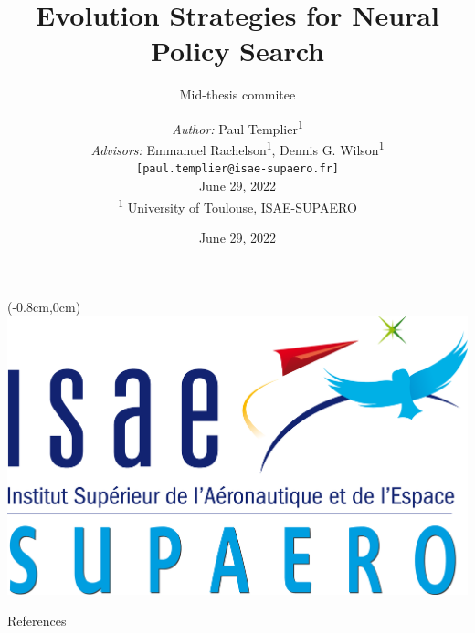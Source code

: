 \documentclass[usenames,dvipsnames,aspectratio=169]{beamer}
\title[Mid-thesis defense]{Evolution Strategies for Neural Policy Search}
\subtitle[]{Mid-thesis commitee}
\author{ 
	\textit{Author:} Paul Templier\textsuperscript{1} \\
	\textit{Advisors:} Emmanuel Rachelson\textsuperscript{1},
	Dennis G. Wilson\textsuperscript{1}\\
	\vspace{1em}
	\texttt{[paul.templier@isae-supaero.fr]}\\
	\vspace{1em}
	June 29, 2022\\
	\vspace{2em}
	\tiny \textsuperscript{1} University of Toulouse, ISAE-SUPAERO	
}
\date{June 29, 2022}
\begin{document}
	
	\begin{frame}{}%
		\begin{textblock*}{2cm}(-0.8cm,0cm) %
			\includegraphics[width=\textwidth]{images/misc/logo-isae-long.png}
		\end{textblock*}
		\vspace{2em}
		\titlepage
		\vspace{-6em}
	\end{frame}

	
	
	
	
	
	
	
	\begin{frame}[allowframebreaks]{References}
		
		
	\end{frame}
	
	\setcounter{lastframe}{\insertframenumber}

	
	
	\setcounter{framenumber}{\thelastframe}
\end{document}
